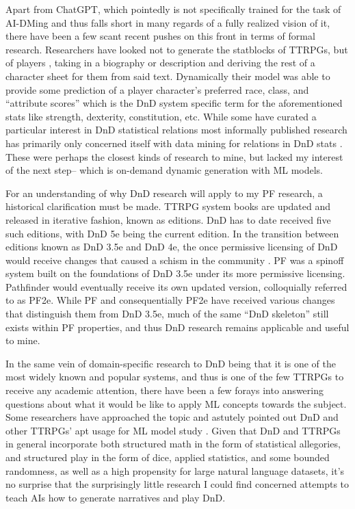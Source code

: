\documentclass[11pt]{article}
\begin{document}
Apart from ChatGPT, which pointedly is not specifically trained for the task of AI-DMing and thus falls short in many regards of a fully realized vision of it, there have been a few scant recent pushes on this front in terms of formal research. Researchers have looked not to generate the statblocks of TTRPGs, but of players \cite{MacInnes2019TheDS}, taking in a biography or description and deriving the rest of a character sheet for them from said text. Dynamically their model was able to provide some prediction of a player character's preferred race, class, and ``attribute scores'' \cite{MacInnes2019TheDS} which is the DnD system specific term for the aforementioned stats like strength, dexterity, constitution, etc. While some have curated a particular interest in DnD statistical relations \cite{holding_2022, keefe_2020} most informally published research has primarily only concerned itself with data mining for relations in DnD stats \cite{cyberscribe_2020}. These were perhaps the closest kinds of research to mine, but lacked my interest of the next step-- which is on-demand dynamic generation with ML models.

For an understanding of why DnD research will apply to my PF research, a historical clarification must be made. TTRPG system books are updated and released in iterative fashion, known as editions. DnD has to date received five such editions, with DnD 5e being the current edition. In the transition between editions known as DnD 3.5e and DnD 4e, the once permissive licensing of DnD would receive changes that caused a schism in the community \cite{author_2011}. PF was a spinoff system built on the foundations of DnD 3.5e under its more permissive licensing. Pathfinder would eventually receive its own updated version, colloquially referred to as PF2e. While PF and consequentially PF2e have received various changes that distinguish them from DnD 3.5e, much of the same ``DnD skeleton'' still exists within PF properties, and thus DnD research remains applicable and useful to mine.

In the same vein of domain-specific research to DnD being that it is one of the most widely known and popular systems, and thus is one of the few TTRPGs to receive any academic attention, there have been a few forays into answering questions about what it would be like to apply ML concepts towards the subject. Some researchers have approached the topic and astutely pointed out DnD and other TTRPGs' apt usage for ML model study \cite{Martin2018DungeonsAD, DBLP:journals/corr/abs-2007-06108}. Given that DnD and TTRPGs in general incorporate both structured math in the form of statistical allegories, and structured play in the form of dice, applied statistics, and some bounded randomness, as well as a high propensity for large natural language datasets, it's no surprise that the surprisingly little research I could find concerned attempts to teach AIs how to generate narratives and play DnD.
\end{document}
